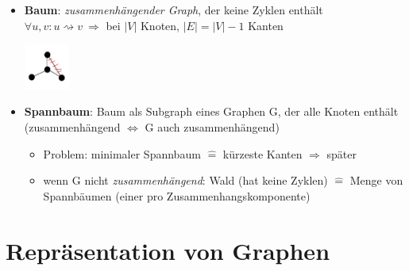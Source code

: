     \begin{itemize}
    \item \textbf{Baum}: \emph{zusammenhängender Graph}, der keine Zyklen enthält \\
    $\forall u,v : u \rightsquigarrow v\  \Rightarrow$ bei $|V|$ Knoten, $|E| = |V| - 1$ Kanten\\
    \begin{flushright}
    \vspace*{-2cm}
    \includegraphics[width=1.5cm,height=1.5cm,keepaspectratio]{./Pictures/Baum_def.png}
    \end{flushright}
    \item \textbf{Spannbaum}: Baum als Subgraph eines Graphen G, der alle Knoten enthält (zusammenhängend $\Leftrightarrow$ G auch zusammenhängend) \\
    \begin{itemize}
        \item Problem: minimaler Spannbaum $\widehat{=}$ kürzeste Kanten $\Rightarrow$ später \\
        \item   wenn G nicht \emph{zusammenhängend}: Wald (hat keine Zyklen) $\widehat{=}$ Menge von Spannbäumen (einer pro Zusammenhangskomponente)
    \end{itemize}
    \end{itemize}

    \section[Graphendatenstrukturen, Adjazenzlisten, Adjazenzmatrizen]{Repräsentation von Graphen}

